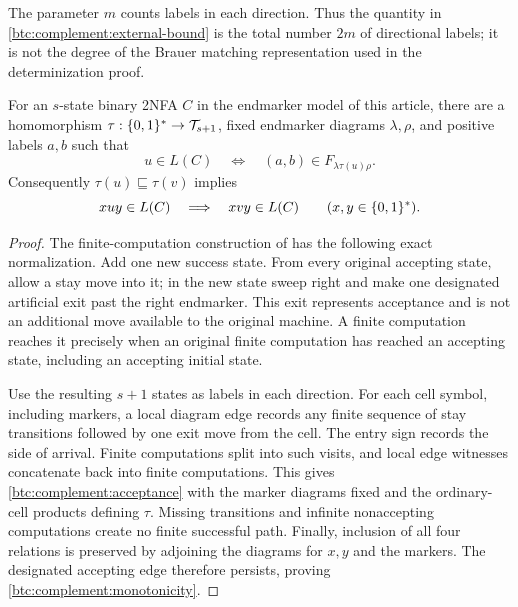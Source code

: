 The parameter $m$ counts labels in each direction. Thus the quantity
in \eqref{btc:complement:external-bound} is the total number $2m$ of
directional labels; it is not the degree of the Brauer matching
representation used in the determinization proof.

\begin{lemma}
\label{btc:complement:representation}
For an $s$-state binary 2NFA $C$ in the endmarker model of this article,
there are a homomorphism $\tau:\{0,1\}^*\to\mathcal T_{s+1}$,
fixed endmarker diagrams $\lambda,\rho$, and positive labels $a,b$
such that
\begin{equation}\label{btc:complement:acceptance}
 u\in L(C)\quad\Longleftrightarrow\quad
 (a,b)\in F_{\lambda\tau(u)\rho}.
\end{equation}
Consequently $\tau(u)\sqsubseteq\tau(v)$ implies
\begin{equation}\label{btc:complement:monotonicity}
 xuy\in L(C)\quad\Longrightarrow\quad xvy\in L(C)
 \qquad(x,y\in\{0,1\}^*).
\end{equation}
\end{lemma}

\begin{proof}
The finite-computation construction of \cite{OpenAIComplement2026}
has the following exact normalization. Add one new success state.
From every original accepting state, allow a stay move into it; in
the new state sweep right and make one designated artificial exit
past the right endmarker. This exit represents acceptance and is
not an additional move available to the original machine. A finite
computation reaches it precisely when an original finite computation
has reached an accepting state, including an accepting initial state.

Use the resulting $s+1$ states as labels in each direction. For each
cell symbol, including markers, a local diagram edge records any
finite sequence of stay transitions followed by one exit move from
the cell. The entry sign records the side of arrival. Finite
computations split into such visits, and local edge witnesses
concatenate back into finite computations. This gives
\eqref{btc:complement:acceptance} with the marker diagrams fixed and
the ordinary-cell products defining $\tau$. Missing transitions and
infinite nonaccepting computations create no finite successful path.
Finally, inclusion of all four relations is preserved by adjoining
the diagrams for $x,y$ and the markers. The designated accepting
edge therefore persists, proving \eqref{btc:complement:monotonicity}.
\end{proof}

